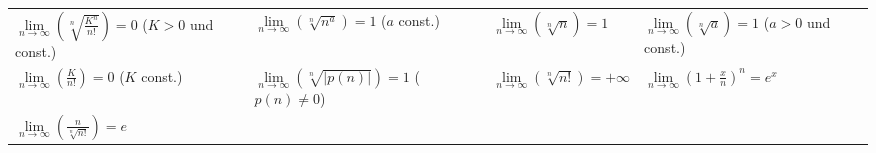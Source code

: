 \begin{tabularx}{\textwidth}{|p{115pt}|p{140pt}|p{90pt}|X|}
\hline
\rowcolor{Gray}
\multicolumn{4}{|c|}{\textbf{Grenzwerte}}\\
\hline
	    $\lim\limits_{n\to\infty}(\sqrt[n]{\frac{K^n}{n!}}) = 0$ \newline($K > 0$ und const.)&		$\lim\limits_{n\to\infty}(\sqrt[n]{n^a}) = 1$ ($a$ const.)&
		$\lim\limits_{n\to\infty}(\sqrt[n]{n}) = 1$ &
		$\lim\limits_{n\to\infty}(\sqrt[n]{a}) = 1$ \newline($a > 0$ und const.) \\
\hline
		$\lim\limits_{n\to\infty}(\frac{K}{n!}) = 0$ ($K$ const.) &
		$\lim\limits_{n\to\infty}(\sqrt[n]{|p(n)|}) = 1$ ($p(n) \neq 0$) &
		$\lim\limits_{n\to\infty}(\sqrt[n]{n!}) = +\infty$ &
		$\lim\limits_{n\to\infty}(1+\frac{x}{n})^n = e^x$
		\\
\hline
		$\lim\limits_{n\to\infty}(\frac{n}{\sqrt[n]{n!}}) = e$ &&&\\
\hline		

\hline
\end{tabularx}	